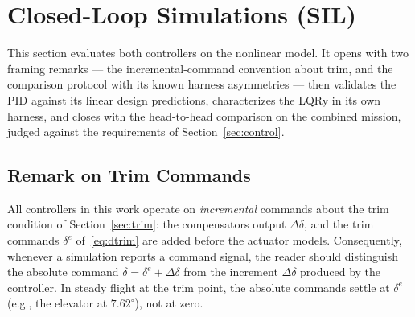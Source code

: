 \section{Closed-Loop Simulations (SIL)}
\label{sec:sil}
This section evaluates both controllers on the nonlinear model. It
opens with two framing remarks --- the incremental-command convention
about trim, and the comparison protocol with its known harness
asymmetries --- then validates the PID against its linear design
predictions, characterizes the LQRy in its own harness, and closes
with the head-to-head comparison on the combined mission, judged
against the requirements of Section~\ref{sec:control}.

\subsection{Remark on Trim Commands}
\label{sec:sil-trim}
All controllers in this work operate on \emph{incremental} commands about
the trim condition of Section~\ref{sec:trim}: the compensators output
$\Delta\delta$, and the trim commands $\delta^e$
of~\eqref{eq:dtrim} are added before the actuator models. Consequently,
whenever a simulation reports a command signal, the reader should
distinguish the absolute command $\delta = \delta^e + \Delta\delta$ from
the increment $\Delta\delta$ produced by the controller. In steady flight
at the trim point, the absolute commands settle at $\delta^e$ (e.g., the
elevator at $7.62^\circ$), not at zero.

